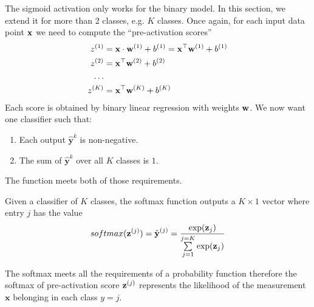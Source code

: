 \documentclass[a4paper]{article}
\begin{document}
The sigmoid activation only works for the binary model. In this section, we extend it for more than 2 classes, e.g. $K$ classes. Once again, for each input data point $\textbf{x}$ we need to compute the ``pre-activation scores'' 
\begin{align*}
    z^{(1)} &= \textbf{x} \cdot \textbf{w}^{(1)} + b^{(1)} = \textbf{x} ^\top \textbf{w}^{(1)} + b^{(1)}  \\
    z^{(2)} &= \textbf{x} ^\top \textbf{w}^{(2)} + b^{(2)}  \\
    \ldots\\
    z^{(K)} &= \textbf{x} ^\top \textbf{w}^{(K)} + b^{(K)} \\
\end{align*}
Each score is obtained by binary linear regression with weights $\textbf{w}$. We now want one classifier such that:
\begin{enumerate}
    \item Each output $\hat{\textbf{y}}^k$  is non-negative.
    \item The sum of $\hat{\textbf{y}}^k$ over all $K$ classes is $1$.
\end{enumerate}
The  function meets both of those requirements.
\begin{definition} Given a classifier of $K$ classes, the softmax function outputs a $K\times 1$ vector where entry $j$ has the value
\begin{equation}
    softmax(\textbf{z}^{(j)})=\hat{\textbf{y}}^{(j)}=\frac{\exp(\textbf{z}_j)}{\sum \limits _{j=1}^{j=K}{\exp(\textbf{z}_j)}}
\end{equation}
\end{definition}
 The softmax meets all the requirements of a probability function therefore the softmax of pre-activation score $\textbf{z} ^ {(j)}$ represents the likelihood of the measurement $\textbf{x}$ belonging in each class $y=j$.
\end{document}
